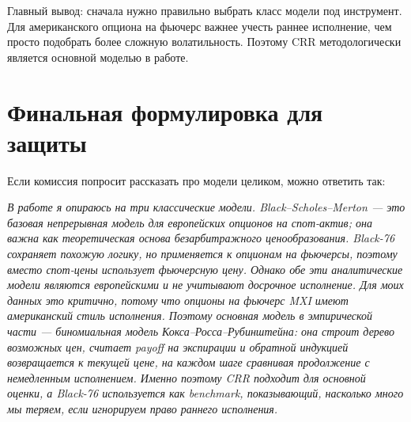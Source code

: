 \documentclass[11pt,a4paper]{article}
\begin{document}
Главный вывод: сначала нужно правильно выбрать класс модели под инструмент. Для американского опциона на фьючерс важнее учесть раннее исполнение, чем просто подобрать более сложную волатильность. Поэтому CRR методологически является основной моделью в работе.

\section{Финальная формулировка для защиты}

Если комиссия попросит рассказать про модели целиком, можно ответить так:

\textit{В работе я опираюсь на три классические модели. Black--Scholes--Merton --- это базовая непрерывная модель для европейских опционов на спот-актив; она важна как теоретическая основа безарбитражного ценообразования. Black-76 сохраняет похожую логику, но применяется к опционам на фьючерсы, поэтому вместо спот-цены использует фьючерсную цену. Однако обе эти аналитические модели являются европейскими и не учитывают досрочное исполнение. Для моих данных это критично, потому что опционы на фьючерс MXI имеют американский стиль исполнения. Поэтому основная модель в эмпирической части --- биномиальная модель Кокса--Росса--Рубинштейна: она строит дерево возможных цен, считает payoff на экспирации и обратной индукцией возвращается к текущей цене, на каждом шаге сравнивая продолжение с немедленным исполнением. Именно поэтому CRR подходит для основной оценки, а Black-76 используется как benchmark, показывающий, насколько много мы теряем, если игнорируем право раннего исполнения.}
\end{document}
